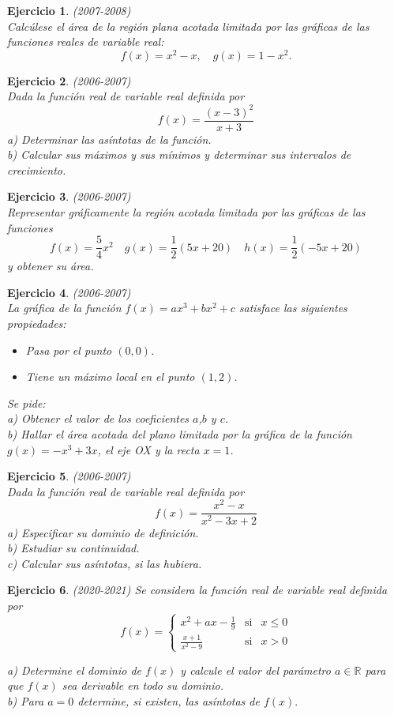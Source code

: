 \documentclass[12pt, a4paper]{amsart}
\newtheorem{ejer}{Ejercicio}
\begin{document}
\begin{ejer}\em (2007-2008)\\
Calcúlese el área de la región plana acotada limitada por las gráficas de las funciones reales de variable real:
$$
f(x)=x^2-x, \quad g(x)=1-x^2.
$$
\end{ejer}

\begin{ejer}\em (2006-2007)\\
Dada la función real de variable real definida por
$$
f(x)=\frac{(x-3)^2}{x+3}
$$
a) Determinar las asíntotas de la función.\\
b) Calcular sus máximos y sus mínimos y determinar sus intervalos de crecimiento.
\end{ejer}

\begin{ejer}\em (2006-2007)\\
Representar gráficamente la región acotada limitada por las gráficas de las funciones
$$
f(x)=\frac{5}{4}x^2 \quad g(x)=\frac{1}{2}(5x+20) \quad h(x)=\frac{1}{2}(-5x+20)
$$
y obtener su área.
\end{ejer}

\begin{ejer}\em (2006-2007)\\
La gráfica de la función $f(x)=ax^3+bx^2+c$ satisface las siguientes propiedades:
\begin{itemize}
\item[$\circ$] Pasa por el punto $(0,0)$.
\item[$\circ$] Tiene un máximo local en el punto $(1,2)$.
\end{itemize}
Se pide:\\
a) Obtener el valor de los coeficientes $a$,$b$ y $c$.\\
b) Hallar el área acotada del plano limitada por la gráfica de la función $g(x)=-x^3+3x$, el eje OX y la recta $x=1$.
\end{ejer}

\begin{ejer}\em (2006-2007)\\
Dada la función real de variable real definida por
$$
f(x)=\frac{x^2-x}{x^2-3x+2}
$$
a) Especificar su dominio de definición.\\
b) Estudiar su continuidad.\\
c) Calcular sus asíntotas, si las hubiera.
\end{ejer}


\begin{ejer}\em (2020-2021)%
Se considera la función real de variable real definida por
\[
f(x)=\left \{ \begin{matrix}
x^2+ax-\frac{1}{9}  & \text{si} & x\leq 0\\
\frac{x+1}{x^2-9} & \text{si} & x> 0
\end{matrix}\right.\]

a) Determine el dominio de $f(x)$ y calcule el valor del parámetro $a\in \mathbb{R}$ para que $f(x)$ sea derivable en todo su dominio.\\
b) Para $a = 0$ determine, si existen, las asíntotas de $f(x).$
\end{ejer}
\end{document}
